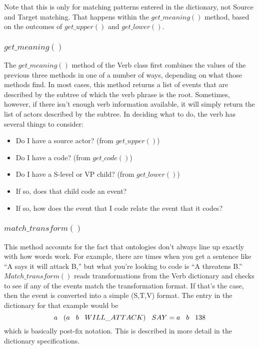 \documentclass[11pt]{article}
\begin{document}
Note that this is only for matching patterns entered in the dictionary, not Source and Target matching. 
That happens within the $get\_meaning()$ method, based on the outcomes of $get\_upper()$ 
and $get\_lower()$.
\subsubsection{$get\_meaning()$}
The $get\_meaning()$ method of the Verb class first combines the values of the 
previous three methods in one of a number of ways, depending on what those 
methods find. In most cases, this method returns a list of events that are described by the 
subtree of which the verb phrase is the root. Sometimes, however, if there isn't 
enough verb information available, it will simply return the list of actors described by 
the subtree. In deciding what to do, the verb has several things to consider: 
\begin{itemize}
\item Do I have a source actor? (from $get\_upper()$)
\item Do I have a code? (from $get\_code()$)
\item Do I have a S-level or VP child? (from $get\_lower()$)
\item If so, does that child code an event?
\item If so, how does the event that I code relate the event that it codes?
\end{itemize}

\subsubsection{$match\_transform()$}
This method accounts for the fact that ontologies don't always 
line up exactly with how words work. For example, there are times when you get 
a sentence like ``A says it will attack B,'' but what you're looking to code is ``A threatens B.''
 $Match\_transform()$ reads transformations from the Verb dictionary and checks 
 to see if any of the events match the transformation format. If that's the 
 case, then the event is converted into a simple (S,T,V) format. The entry in 
 the dictionary for that example would be $$ a  \hspace{3mm}(a \hspace{3mm} b \hspace{3mm} WILL\_ATTACK)\hspace{3mm} SAY = a\hspace{3mm} b\hspace{3mm} 138 $$ 
 which is basically post-fix notation. This is described in more detail in the dictionary 
 specifications.
 
\end{document}

